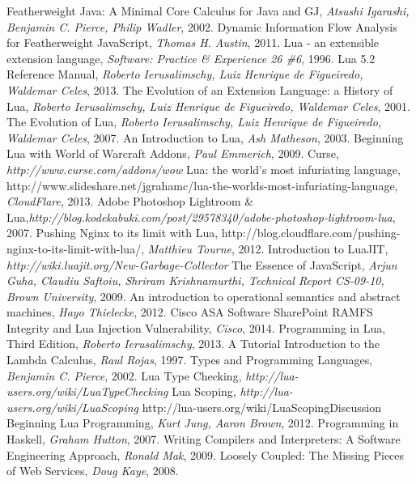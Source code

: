 \begin{thebibliography}{10}

 Featherweight Java: A Minimal Core Calculus for Java and GJ, {\it Atsushi Igarashi, Benjamin C. Pierce, Philip Wadler}, 2002.
 Dynamic Information Flow Analysis for Featherweight JavaScript, {\it Thomas H. Austin}, 2011.
 Lua - an extensible extension language, {\it  Software: Practice \& Experience 26 \#6}, 1996.
 Lua 5.2 Reference Manual, {\it Roberto Ierusalimschy, Luiz Henrique de Figueiredo, Waldemar Celes}, 2013.
 The Evolution of an Extension Language: a History of Lua, {\it  Roberto Ierusalimschy, Luiz Henrique de Figueiredo, Waldemar Celes}, 2001.
 The Evolution of Lua, {\it Roberto Ierusalimschy, Luiz Henrique de Figueiredo, Waldemar Celes}, 2007.
 An Introduction to Lua, {\it  Ash Matheson}, 2003.
 Beginning Lua with World of Warcraft Addons, {\it Paul Emmerich}, 2009.
 Curse, {\it http://www.curse.com/addons/wow}
 Lua: the world's most infuriating language, http://www.slideshare.net/jgrahamc/lua-the-worlds-most-infuriating-language, {\it CloudFlare}, 2013.
 Adobe Photoshop Lightroom \& Lua,{\it http://blog.kodekabuki.com/post/29578340/adobe-photoshop-lightroom-lua}, 2007.
 Pushing Nginx to its limit with Lua, http://blog.cloudflare.com/pushing-nginx-to-its-limit-with-lua/, {\it  Matthieu Tourne}, 2012.
 Introduction to LuaJIT, {\it http://wiki.luajit.org/New-Garbage-Collector}
 The Essence of JavaScript, {\it Arjun Guha, Claudiu Saftoiu, Shriram Krishnamurthi, Technical Report CS-09-10, Brown University}, 2009.
 An introduction to operational semantics and abstract machines, {\it Hayo Thielecke}, 2012.
 Cisco ASA Software SharePoint RAMFS Integrity and Lua Injection Vulnerability, {\it Cisco}, 2014.
 Programming in Lua, Third Edition, {\it  Roberto Ierusalimschy}, 2013.
 A Tutorial Introduction to the Lambda Calculus, {\it Raul Rojas}, 1997.
 Types and Programming Languages, {\it Benjamin C. Pierce}, 2002.
 Lua Type Checking, {\it http://lua-users.org/wiki/LuaTypeChecking}
 Lua Scoping, {\it http://lua-users.org/wiki/LuaScoping}
 http://lua-users.org/wiki/LuaScopingDiscussion
 Beginning Lua Programming, {\it Kurt Jung, Aaron Brown}, 2012.
 Programming in Haskell, {\it Graham Hutton}, 2007.
 Writing Compilers and Interpreters: A Software Engineering Approach, {\it Ronald Mak}, 2009.
 Loosely Coupled: The Missing Pieces of Web Services, {\it Doug Kaye}, 2008.
\\

\end{thebibliography}
